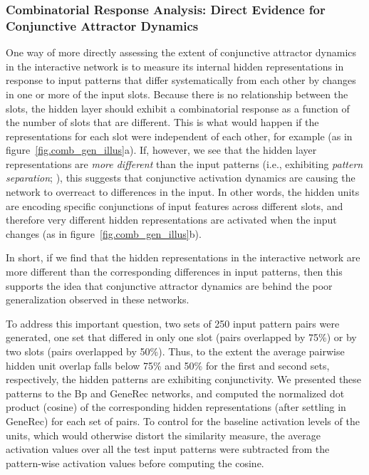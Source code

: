 \documentclass[12pt,twoside]{article}
\begin{document}
\subsubsection{Combinatorial Response Analysis: Direct Evidence for
  Conjunctive Attractor Dynamics}

One way of more directly assessing the extent of conjunctive attractor
dynamics in the interactive network is to measure its internal hidden
representations in response to input patterns that differ
systematically from each other by changes in one or more of the input
slots.  Because there is no relationship between the slots, the hidden
layer should exhibit a combinatorial response as a function of the
number of slots that are different.  This is what would happen if the
representations for each slot were independent of each other, for
example (as in figure~\ref{fig.comb_gen_illus}a).  If, however, we see
that the hidden layer representations are {\em more different} than
the input patterns (i.e., exhibiting {\em pattern separation};
), this suggests that conjunctive
activation dynamics are causing the network to overreact to
differences in the input.  In other words, the hidden units are
encoding specific conjunctions of input features across different
slots, and therefore very different hidden representations are
activated when the input changes (as in
figure~\ref{fig.comb_gen_illus}b).

In short, if we find that the hidden representations in the
interactive network are more different than the corresponding
differences in input patterns, then this supports the idea that
conjunctive attractor dynamics are behind the poor generalization
observed in these networks.

To address this important question, two sets of 250 input pattern
pairs were generated, one set that differed in only one slot (pairs
overlapped by 75\%) or by two slots (pairs overlapped by 50\%).  Thus,
to the extent the average pairwise hidden unit overlap falls below
75\% and 50\% for the first and second sets, respectively, the hidden
patterns are exhibiting conjunctivity.  We presented these patterns to
the Bp and GeneRec networks, and computed the normalized dot product
(cosine) of the corresponding hidden representations (after settling
in GeneRec) for each set of pairs.  To control for the baseline
activation levels of the units, which would otherwise distort the
similarity measure, the average activation values over all the test
input patterns were subtracted from the pattern-wise activation values
before computing the cosine.
\end{document}
